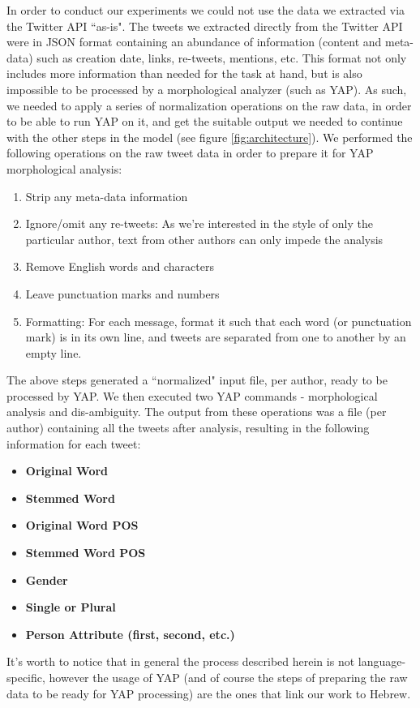 \documentclass[a4paper]{article}
\begin{document}
In order to conduct our experiments we could not use the data we extracted via the Twitter API ``as-is". The tweets we extracted directly from the Twitter API were in JSON format containing an abundance of information (content and meta-data) such as creation date, links, re-tweets, mentions, etc. This format not only includes more information than needed for the task at hand, but is also impossible to be processed by a morphological analyzer (such as YAP). As such, we needed to apply a series of normalization operations on the raw data, in order to be able to run YAP on it, and get the suitable output we needed to continue with the other steps in the model (see figure \ref{fig:architecture}).
We performed the following operations on the raw tweet data in order to prepare it for YAP morphological analysis:\\
\begin{enumerate}
	\item Strip any meta-data information
	\item Ignore/omit any re-tweets: As we're interested in the style of only the particular author, text from other authors can only impede the analysis
	\item Remove English words and characters
	\item Leave punctuation marks and numbers
	\item Formatting: For each message, format it such that each word (or punctuation mark) is in its own line, and tweets are separated from one to another by an empty line.
\end{enumerate}
The above steps generated a ``normalized" input file, per author, ready to be processed by YAP. We then executed two YAP commands - morphological analysis and dis-ambiguity. The output from these operations was a file (per author) containing all the tweets after analysis, resulting in the following information for each tweet:\\
\begin{itemize}
\item \textbf{Original Word}
\item \textbf{Stemmed Word}
\item \textbf{Original Word POS}
\item \textbf{Stemmed Word POS}
\item \textbf{Gender}
\item \textbf{Single or Plural}
\item \textbf{Person Attribute (first, second, etc.)}
\end{itemize}
It's worth to notice that in general the process described herein is not language-specific, however the usage of YAP (and of course the steps of preparing the raw data to be ready for YAP processing) are the ones that link our work to Hebrew.
\end{document}
